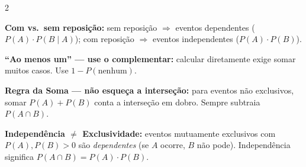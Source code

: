 \documentclass[12pt]{article}
\begin{document}
\begin{multicols}{2}

\textbf{Com vs.\ sem reposição:} sem reposição $\Rightarrow$ eventos dependentes ($P(A) \cdot P(B\mid A)$); com reposição $\Rightarrow$ eventos independentes ($P(A) \cdot P(B)$).

\vspace{4px}
\textbf{``Ao menos um'' — use o complementar:} calcular diretamente exige somar muitos casos. Use $1 - P(\text{nenhum})$.

\vspace{4px}
\textbf{Regra da Soma — não esqueça a interseção:} para eventos não exclusivos, somar $P(A)+P(B)$ conta a interseção em dobro. Sempre subtraia $P(A \cap B)$.

\vspace{4px}
\textbf{Independência $\neq$ Exclusividade:} eventos mutuamente exclusivos com $P(A), P(B) > 0$ são \textit{dependentes} (se $A$ ocorre, $B$ não pode). Independência significa $P(A \cap B) = P(A)\cdot P(B)$.

\end{multicols}

\end{document}
